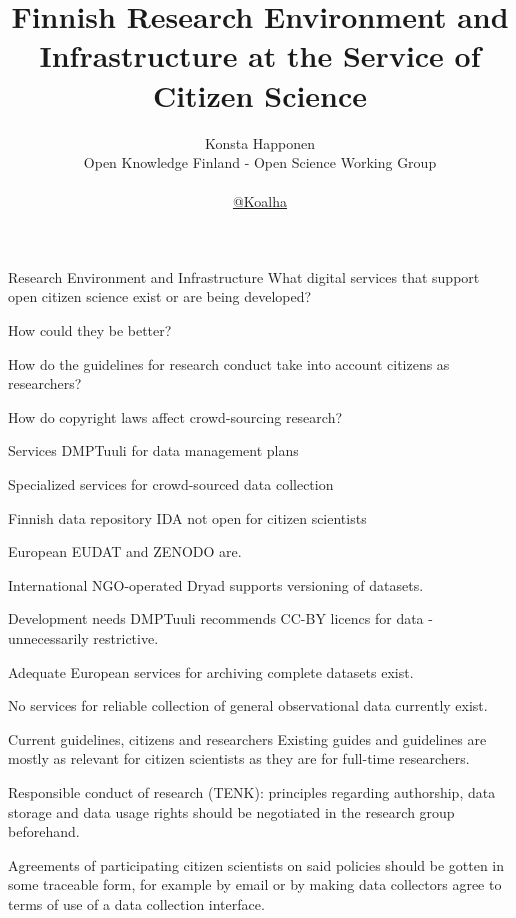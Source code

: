 \documentclass{beamer}
\title{Finnish Research Environment and Infrastructure at the Service of Citizen Science}
\author{\parbox{\textwidth}{Konsta Happonen\\
    Open Knowledge Finland - Open Science Working Group\\
    \\
    \href{http://twitter.com/koalha}{@Koalha}\\
}}
\date{}
\begin{document}
\maketitle



\begin{frame}{Research Environment and Infrastructure}
  What digital services that support open citizen science exist or are being developed?
%
%
%

  How could they be better?

  How do the guidelines for research conduct take into account citizens as researchers?

  How do copyright laws affect crowd-sourcing research?

\end{frame}


\begin{frame}{Services}
  DMPTuuli for data management plans

  Specialized services for crowd-sourced data collection

  Finnish data repository IDA not open for citizen scientists

  European EUDAT and ZENODO are.

  International NGO-operated Dryad supports versioning of datasets. 
\end{frame}


\begin{frame}{Development needs}
  DMPTuuli recommends CC-BY licencs for data - unnecessarily restrictive.

  Adequate European services for archiving complete datasets exist.

  No services for reliable collection of general observational data currently exist.
\end{frame}


\begin{frame}{Current guidelines, citizens and researchers}
  Existing guides and guidelines are mostly as relevant for citizen scientists as they are for full-time researchers. 

  Responsible conduct of research (TENK): principles regarding authorship, data storage and data usage rights should be negotiated in the research group beforehand. %

  Agreements of participating citizen scientists on said policies should be gotten in some traceable form, for example by email or by making data collectors agree to terms of use of a data collection interface.
\end{frame}
\end{document}
